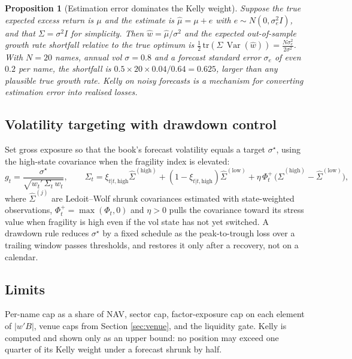 \documentclass[11pt,a4paper]{article}
\newtheorem{proposition}{Proposition}[section]
\theoremstyle{definition}
\newcommand{\Var}{\operatorname{Var}}
\begin{document}
\begin{proposition}[Estimation error dominates the Kelly weight]
Suppose the true expected excess return is $\mu$ and the estimate is $\hat\mu = \mu + e$ with $e \sim N(0, \sigma^2_e I)$, and that $\Sigma = \sigma^2 I$ for simplicity. Then $\hat{w} = \hat\mu/\sigma^2$ and the expected out-of-sample growth rate shortfall relative to the true optimum is $\tfrac{1}{2}\,\mathrm{tr}(\Sigma\,\Var(\hat w)) = \tfrac{N\sigma_e^2}{2\sigma^2}$. With $N = 20$ names, annual vol $\sigma = 0.8$ and a forecast standard error $\sigma_e$ of even $0.2$ per name, the shortfall is $0.5 \times 20 \times 0.04/0.64 = 0.625$, larger than any plausible true growth rate. Kelly on noisy forecasts is a mechanism for converting estimation error into realised losses.
\end{proposition}

\subsection{Volatility targeting with drawdown control}

Set gross exposure so that the book's forecast volatility equals a target $\sigma^\star$, using the high-state covariance when the fragility index is elevated:
\begin{equation}
g_t = \frac{\sigma^\star}{\sqrt{w_t'\,\Sigma_t\,w_t}}, \qquad \Sigma_t = \xi_{t|t,\mathrm{high}}\hat\Sigma^{(\mathrm{high})} + (1 - \xi_{t|t,\mathrm{high}})\hat\Sigma^{(\mathrm{low})} + \eta\,\Phi_t^{+}\,\big(\hat\Sigma^{(\mathrm{high})} - \hat\Sigma^{(\mathrm{low})}\big),
\end{equation}
where $\hat\Sigma^{(j)}$ are Ledoit--Wolf shrunk covariances estimated with state-weighted observations, $\Phi_t^{+} = \max(\Phi_t, 0)$ and $\eta > 0$ pulls the covariance toward its stress value when fragility is high even if the vol state has not yet switched. A drawdown rule reduces $\sigma^\star$ by a fixed schedule as the peak-to-trough loss over a trailing window passes thresholds, and restores it only after a recovery, not on a calendar.

\subsection{Limits}

Per-name cap as a share of NAV, sector cap, factor-exposure cap on each element of $|w'B|$, venue caps from Section \ref{sec:venue}, and the liquidity gate. Kelly is computed and shown only as an upper bound: no position may exceed one quarter of its Kelly weight under a forecast shrunk by half.
\end{document}
